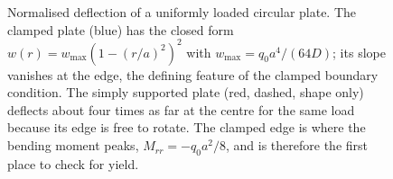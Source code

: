 \begin{figure}[htbp]
\centering
{}
\caption[Clamped circular plate deflection profile]{Normalised
deflection of a uniformly loaded circular plate. The clamped plate
(blue) has the closed form $w(r) = w_{\max}(1-(r/a)^2)^2$ with
$w_{\max} = q_0 a^4/(64D)$; its slope vanishes at the edge, the
defining feature of the clamped boundary condition. The simply
supported plate (red, dashed, shape only) deflects about four times
as far at the centre for the same load because its edge is free to
rotate. The clamped edge is where the bending moment peaks,
$M_{rr} = -q_0 a^2/8$, and is therefore the first place to check
for yield.}
\label{fig:vol03ch09:circular-plate-deflection}
\end{figure}
